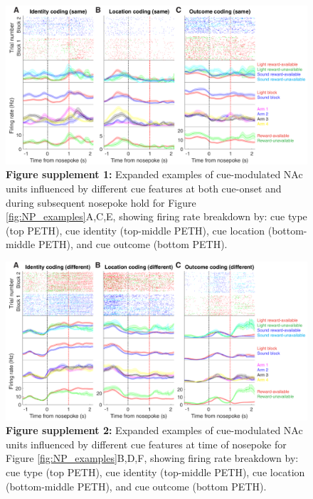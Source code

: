 \documentclass[11pt]{article}
\newcommand{\bsf}[1]{\textbf{#1}}
\begin{document}
 \begin{figure}[ht!]
\centering
\includegraphics[width=\textwidth]{Fig 7 - NP Neural examples SUPP1.pdf}
\caption*{\bsf{Figure supplement 1:} Expanded examples of cue-modulated NAc units influenced by different cue features at both cue-onset and during subsequent nosepoke hold for Figure \ref{fig:NP_examples}A,C,E, showing firing rate breakdown by: cue type (top PETH), cue identity (top-middle PETH), cue location (bottom-middle PETH), and cue outcome (bottom PETH).}
\label{fig:NP_examplesSUPP1}
\end{figure} \clearpage

 \begin{figure}[ht!]
\centering
\includegraphics[width=\textwidth]{Fig 7 - NP Neural examples SUPP2.pdf}
\caption*{\bsf{Figure supplement 2:} Expanded examples of cue-modulated NAc units influenced by different cue features at time of nosepoke for Figure \ref{fig:NP_examples}B,D,F, showing firing rate breakdown by: cue type (top PETH), cue identity (top-middle PETH), cue location (bottom-middle PETH), and cue outcome (bottom PETH).}
\label{fig:NP_examplesSUPP2}
\end{figure} \clearpage
\end{document}
